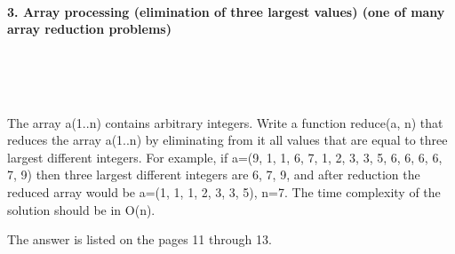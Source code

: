 \documentclass{article}
\begin{document}
	
	\rmfamily
	
	\paragraph{3. Array processing (elimination of three largest values) (one of many array reduction problems) }\
	
	\rmfamily\
	
		The array a(1..n) contains arbitrary integers. Write a function reduce(a, n) that reduces the array a(1..n) by eliminating from it all values that are equal to three largest different integers. For example, if a=(9, 1, 1, 6, 7, 1, 2, 3, 3, 5, 6, 6, 6, 6, 7, 9) then three largest different integers are 6, 7, 9, and after reduction the reduced array would be a=(1, 1, 1, 2, 3, 3, 5), n=7. The time complexity of the solution should be in O(n). 
		\newline
		
		The answer is listed on the pages 11 through 13.
		
	\ttfamily\
	
\paragraph{}\
\paragraph{}\
\paragraph{}\
\paragraph{}\
\paragraph{}\
\paragraph{}\
\paragraph{}\
\paragraph{}\
\paragraph{}\
\end{document}
